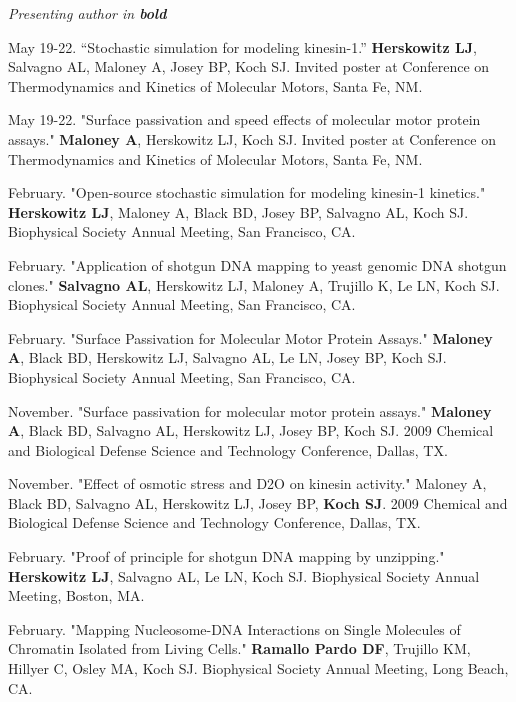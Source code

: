 \documentclass[11pt]{article}
\begin{document}
\bigskip


\medskip
\noindent\emph{Presenting author in \textbf{bold} \vspace{0.05in}}

 May 19-22. “Stochastic simulation for modeling kinesin-1.” \textbf{Herskowitz LJ}, Salvagno AL, Maloney A, Josey BP, Koch SJ. Invited poster at Conference on Thermodynamics and Kinetics of Molecular Motors, Santa Fe, NM.

 May 19-22. "Surface passivation and speed effects of molecular motor protein assays." \textbf{Maloney A}, Herskowitz LJ, Koch SJ. Invited poster at Conference on Thermodynamics and Kinetics of Molecular Motors, Santa Fe, NM.

 February. "Open-source stochastic simulation for modeling kinesin-1 kinetics." \textbf{Herskowitz LJ}, Maloney A, Black BD, Josey BP, Salvagno AL, Koch SJ. Biophysical Society Annual Meeting, San Francisco, CA.

 February. "Application of shotgun DNA mapping to yeast genomic DNA shotgun clones." \textbf{Salvagno AL}, Herskowitz LJ, Maloney A, Trujillo K, Le LN, Koch SJ. Biophysical Society Annual Meeting, San Francisco, CA.

 February. "Surface Passivation for Molecular Motor Protein Assays." \textbf{Maloney A}, Black BD, Herskowitz LJ, Salvagno AL, Le LN, Josey BP, Koch SJ. Biophysical Society Annual Meeting, San Francisco, CA.

 November. "Surface passivation for molecular motor protein assays." \textbf{Maloney A}, Black BD, Salvagno AL, Herskowitz LJ, Josey BP, Koch SJ. 2009 Chemical and Biological Defense Science and Technology Conference, Dallas, TX.

 November. "Effect of osmotic stress and D2O on kinesin activity." Maloney A, Black BD, Salvagno AL, Herskowitz LJ, Josey BP, \textbf{Koch SJ}. 2009 Chemical and Biological Defense Science and Technology Conference, Dallas, TX.

 February. "Proof of principle for shotgun DNA mapping by unzipping." \textbf{Herskowitz LJ}, Salvagno AL, Le LN, Koch SJ.  Biophysical Society Annual Meeting, Boston, MA.

 February. "Mapping Nucleosome-DNA Interactions on Single Molecules of Chromatin Isolated from Living Cells." \textbf{Ramallo Pardo DF}, Trujillo KM, Hillyer C, Osley MA, Koch SJ.  Biophysical Society Annual Meeting, Long Beach, CA.
\end{document}
